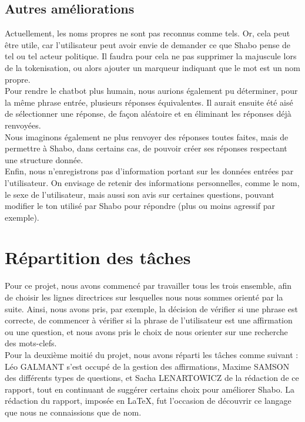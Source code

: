 \documentclass[paper=a4]{article}
\begin{document}
\subsection{Autres améliorations}

Actuellement, les noms propres ne sont pas reconnus comme tels. Or, cela peut être
utile, car l'utilisateur peut avoir envie de demander ce que Shabo pense
de tel ou tel acteur politique. Il faudra pour cela ne pas supprimer la
majuscule lors de la tokenisation, ou alors ajouter un marqueur
indiquant que le mot est un nom propre. \\

Pour rendre le chatbot plus humain, nous aurions également pu
déterminer, pour la même phrase entrée, plusieurs réponses équivalentes.
Il aurait ensuite été aisé de sélectionner une réponse, de façon
aléatoire et en éliminant les réponses déjà renvoyées. \\

Nous imaginons également ne plus renvoyer des réponses toutes faites,
mais de permettre à Shabo, dans certains cas, de pouvoir créer ses
réponses respectant une structure donnée. \\

Enfin, nous n'enregistrons pas d'information portant sur les données
entrées par l'utilisateur. On envisage de retenir des informations
personnelles, comme le nom, le sexe de l'utilisateur, mais aussi son
avis sur certaines questions, pouvant modifier le ton utilisé par Shabo
pour répondre (plus ou moins agressif par exemple). \\



\section{Répartition des tâches}

Pour ce projet, nous avons commencé par travailler tous les trois
ensemble, afin de choisir les lignes directrices sur lesquelles nous
nous sommes orienté par la suite. Ainsi, nous avons pris, par exemple,
la décision de vérifier si une phrase est correcte, de commencer à
vérifier si la phrase de l'utilisateur est une affirmation ou une
question, et nous avons pris le choix de nous orienter sur une recherche
des mots-clefs. \\

Pour la deuxième moitié du projet, nous avons réparti les tâches comme
suivant : Léo GALMANT s'est occupé de la gestion des affirmations,
Maxime SAMSON des différents types de questions, et Sacha LENARTOWICZ de
la rédaction de ce rapport, tout en continuant de suggérer certains
choix pour améliorer Shabo. La rédaction du rapport, imposée en LaTeX,
fut l'occasion de découvrir ce langage que nous ne connaissions que de
nom. \\
\end{document}
